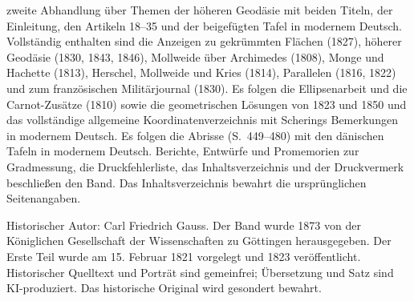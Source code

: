 zweite Abhandlung über Themen der höheren Geodäsie mit beiden Titeln, der Einleitung, den Artikeln 18--35 und der beigefügten Tafel in modernem Deutsch. Vollständig enthalten sind die Anzeigen zu gekrümmten Flächen (1827), höherer Geodäsie (1830, 1843, 1846), Mollweide über Archimedes (1808), Monge und Hachette (1813), Herschel, Mollweide und Kries (1814), Parallelen (1816, 1822) und zum französischen Militärjournal (1830). Es folgen die Ellipsenarbeit und die Carnot-Zusätze (1810) sowie die geometrischen Lösungen von 1823 und 1850 und das vollständige allgemeine Koordinatenverzeichnis mit Scherings Bemerkungen in modernem Deutsch. Es folgen die Abrisse (S.~449--480) mit den dänischen Tafeln in modernem Deutsch. Berichte, Entwürfe und Promemorien zur Gradmessung, die Druckfehlerliste, das Inhaltsverzeichnis und der Druckvermerk beschließen den Band. Das Inhaltsverzeichnis bewahrt die ursprünglichen Seitenangaben.\par\medskip\noindent Historischer Autor: Carl Friedrich Gauss. Der Band wurde 1873 von der Königlichen Gesellschaft der Wissenschaften zu Göttingen herausgegeben. Der Erste Teil wurde am 15. Februar 1821 vorgelegt und 1823 veröffentlicht. Historischer Quelltext und Porträt sind gemeinfrei; Übersetzung und Satz sind KI-produziert. Das historische Original wird gesondert bewahrt.\par\endgroup\clearpage
